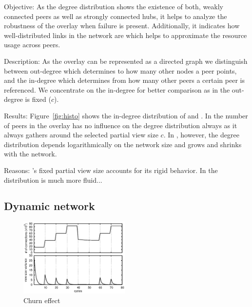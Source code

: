 \begin{asparadesc}
\item[Objective:] As the degree distribution shows the existence of both,
  weakly connected peers as well as strongly connected hubs, it helps to
  analyze the robustness of the overlay when failure is present.  Additionally,
  it indicates how well-distributed links in the network are which
  helps to approximate the resource usage across peers.
\item[Description:] As the overlay can be represented as a directed graph we
  distinguish between out-degree which determines to how many other nodes a
  peer points, and the in-degree which determines from how many other peers a
  certain peer is referenced.  We concentrate on the in-degree for better
  comparison as in \CYCLON{} the out-degree is fixed ($c$).
\item[Results:] Figure~\ref{fig:histo} shows the in-degree distribution of
  \CYCLON{} and \SCAMPLON{}.  In \CYCLON{} the number of peers in the overlay
  has no influence on the degree distribution always as it always gathers
  around the selected partial view size $c$.  In \SCAMPLON{}, however, the
  degree distribution depends logarithmically on the network size and grows and
  shrinks with the network.
\item[Reasons:] \CYCLON{}'s fixed partial view size accounts for its rigid
  behavior.  In \SCAMPLON{} the distribution is much more fluid...
\end{asparadesc}

\subsection{Dynamic network}

\begin{figure}
  \centering
  \includegraphics[width=0.49\textwidth]{img/churn.eps}
  \caption{\label{fig:churn}Churn effect}
\end{figure}

